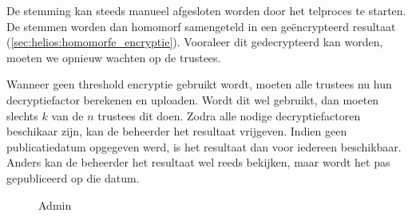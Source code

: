 De stemming kan steeds manueel afgesloten worden door het telproces te starten. De stemmen worden dan homomorf samengeteld in een geëncrypteerd resultaat (\ref{sec:helios:homomorfe_encryptie}). Vooraleer dit gedecrypteerd kan worden, moeten we opnieuw wachten op de trustees.

\npar Wanneer geen threshold encryptie gebruikt wordt, moeten alle trustees nu hun decryptiefactor berekenen en uploaden. Wordt dit wel gebruikt, dan moeten slechts $k$ van de $n$ trustees dit doen. Zodra alle nodige decryptiefactoren beschikaar zijn, kan de beheerder het resultaat vrijgeven. Indien geen publicatiedatum opgegeven werd, is het resultaat dan voor iedereen beschikbaar. Anders kan de beheerder het resultaat wel reeds bekijken, maar wordt het pas gepubliceerd op die datum.

\begin{figure}
  \caption{Admin}
  \label{fig:proc:elections_admin}
\end{figure}
